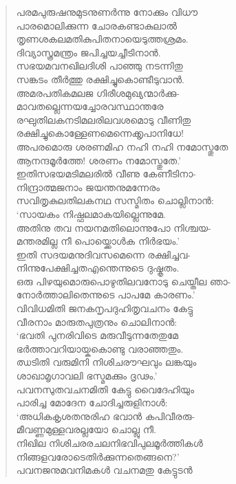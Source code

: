 \begin{verse}
പരമപുരുഷനുമുടനുണര്‍ന്നു നോക്കും വിധൗ\\
പാരമൊലിക്കുന്ന ചോരകണ്ടാകുലാല്‍\\
തൃണശകലമതികുപിതനായെടുത്തശ്രമം.\\
ദിവ്യാസ്ത്രമന്ത്രം ജപിച്ചയച്ചീടിനാന്‍.\\
സഭയമവനഖിലദിശി പാഞ്ഞു നടന്നിതു\\
സങ്കടം തീര്‍ത്തു രക്ഷിച്ചുകൊണ്ടീടുവാന്‍.\\
അമരപതികമലജ ഗിരീശമുഖ്യന്മാര്‍ക്കു-\\
മാവതല്ലെന്നയച്ചോരവസ്ഥാന്തരേ\\
രഘുതിലകനടിമലരിലവശമൊടു വീണിതു\\
രക്ഷിച്ചുകൊള്ളേണമെന്നെക്കൃപാനിധേ!\\
അപരമൊരു ശരണമിഹ നഹി നഹി നമോസ്തുതേ\\
ആനന്ദമൂര്‍ത്തേ! ശരണം നമോസ്തുതേ.’\\
ഇതിസഭയമടിമലരില്‍ വീണു കേണീടിനാ-\\
നിന്ദ്രാത്മജനാം ജയന്തനുമന്നേരം\\
സവിതൃകുലതിലകനഥ സസ്മിതം ചൊല്ലിനാന്‍:\\
‘സായകം നിഷ്ഫലമാകയില്ലെന്നുമേ.\\
അതിനു തവ നയനമതിലൊന്നുപോ നിശ്ചയ-\\
മന്തരമില്ല നീ പൊയ്ക്കൊള്‍ക നിര്‍ഭയം.’\\
ഇതി സദയമനുദിവസമെന്നെ രക്ഷിച്ചവ-\\
നിന്നുപേക്ഷിച്ചതഎന്തെന്നുടെ ദുഷ്കൃതം.\\
ഒരു പിഴയുമൊരുപൊഴുതിലവനോടു ചെയ്തീല ഞാ-\\
നോര്‍ത്താലിതെന്നുടെ പാപമേ കാരണം.’\\
വിവിധമിതി ജനകനൃപദുഹിതൃവചനം കേട്ടു\\
വീരനാം മാരുതപുത്രനും ചൊലിനാന്‍:\\
‘ഭവതി പുനരിവിടെ മരുവീടുന്നതേതുമേ\\
ഭര്‍ത്താവറിയായ്കകൊണ്ടു വരാഞ്ഞതും.\\
ഝടിതി വരുമിനി നിശിചരൗഘവും ലങ്കയും\\
ശാഖാമൃഗാവലി ഭസ്മമക്കും ദൃഢം.’\\
പവനസുതവചനമിതി കേട്ടു വൈദേഹിയും\\
പാരിച്ച മോദേന ചോദിച്ചരുളിനാള്‍:\\
‘അധികകൃശതനുരിഹ ഭവാന്‍ കപിവീരരു-\\
മീവണ്ണമുള്ളവരല്ലയോ ചൊല്ലു നീ.\\
നിഖില നിശിചരരചലനിഭവിപുലമൂര്‍ത്തികള്‍\\
നിങ്ങളവരോടെതിര്‍ക്കുന്നതെങ്ങനെ?’\\
പവനജനുമവനിമകള്‍ വചനമതു കേട്ടുടന്‍\\

\end{verse}
